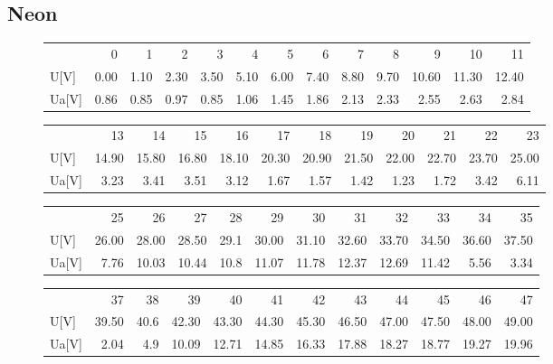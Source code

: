 \documentclass[a4paper,10pt]{article}
\begin{document}
\subsection{Neon}
\begin{figure}[H]
\begin{tabular}{lrrrrrrrrrrrr}
{} &    0  &    1  &    2  &    3  &    4  &    5  &    6  &    7  &    8  &     9  &     10 &     11 \\
U[V]  &  0.00 &  1.10 &  2.30 &  3.50 &  5.10 &  6.00 &  7.40 &  8.80 &  9.70 &  10.60 &  11.30 &  12.40 \\
Ua[V] &  0.86 &  0.85 &  0.97 &  0.85 &  1.06 &  1.45 &  1.86 &  2.13 &  2.33 &   2.55 &   2.63 &   2.84 \\
\end{tabular}
\end{figure}
\begin{figure}[H]
\begin{tabular}{lrrrrrrrrrrr}
{} &     13 &     14 &     15 &     16 &     17 &     18 &     19 &     20 &     21 &     22 &     23 \\
U[V]  &  14.90 &  15.80 &  16.80 &  18.10 &  20.30 &  20.90 &  21.50 &  22.00 &  22.70 &  23.70 &  25.00 \\
Ua[V] &   3.23 &   3.41 &   3.51 &   3.12 &   1.67 &   1.57 &   1.42 &   1.23 &   1.72 &   3.42 &   6.11 \\
\end{tabular}
\end{figure}

\begin{figure}[H]
\begin{tabular}{lrrrrrrrrrrr}

{} &     25 &     26 &     27 &    28 &     29 &     30 &     31 &     32 &     33 &     34 &     35 \\

U[V]  &  26.00 &  28.00 &  28.50 &  29.1 &  30.00 &  31.10 &  32.60 &  33.70 &  34.50 &  36.60 &  37.50 \\
Ua[V] &   7.76 &  10.03 &  10.44 &  10.8 &  11.07 &  11.78 &  12.37 &  12.69 &  11.42 &   5.56 &   3.34 \\

\end{tabular}
\end{figure}

\begin{figure}[H]
\begin{tabular}{lrrrrrrrrrrr}

{} &     37 &    38 &     39 &     40 &     41 &     42 &     43 &     44 &     45 &     46 &     47 \\

U[V]  &  39.50 &  40.6 &  42.30 &  43.30 &  44.30 &  45.30 &  46.50 &  47.00 &  47.50 &  48.00 &  49.00 \\
Ua[V] &   2.04 &   4.9 &  10.09 &  12.71 &  14.85 &  16.33 &  17.88 &  18.27 &  18.77 &  19.27 &  19.96 \\

\end{tabular}
\end{figure}
\end{document}
